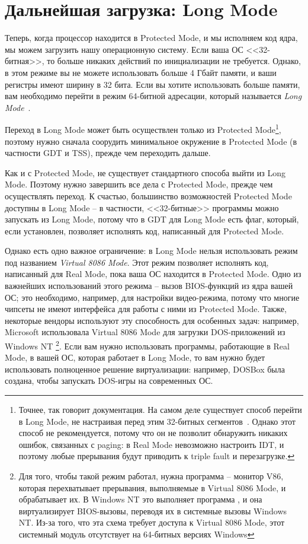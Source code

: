 \documentclass[a4page]{article}
\begin{document}
\section{Дальнейшая загрузка: Long Mode}

Теперь, когда процессор находится в Protected Mode,
и мы исполняем код ядра,
мы можем загрузить нашу операционную систему.
Если ваша ОС <<32-битная>>, то больше никаких действий по инициализации не требуется.
Однако, в этом режиме вы не можете использовать больше 4 Гбайт памяти,
и ваши регистры имеют ширину в 32 бита.
Если вы хотите использовать больше памяти,
вам необходимо перейти в режим 64-битной адресации, который называется \emph{Long Mode}~\cite{enwiki:longmode}.

Переход в Long Mode может быть осуществлен только из Protected Mode\footnote{
Точнее, так говорит документация.
На самом деле существует способ перейти в Long Mode,
не настраивая перед этим 32-битных сегментов~\cite{osforum:directlongmode}.
Однако этот способ не рекомендуется,
потому что он не позволит обнаружить никаких ошибок, связанных с paging:
в Real Mode невозможно настроить IDT, и поэтому любые прерывания будут приводить к triple fault и перезагрузке.},
поэтому нужно сначала соорудить минимальное окружение в Protected Mode
(в частности GDT и TSS), прежде чем переходить дальше.

Как и с Protected Mode, не существует стандартного способа выйти из Long Mode.
Поэтому нужно завершить все дела с Protected Mode, прежде чем осуществлять переход.
К счастью, большинство возможностей Protected Mode доступны в Long Mode -- 
в частности, <<32-битные>> программы можно запускать из Long Mode,
потому что в GDT для Long Mode есть флаг, который, если установлен,
позволяет исполнять код, написанный для Protected Mode.

Однако есть одно важное ограничение: в Long Mode нельзя использовать
режим под названием \emph{Virtual 8086 Mode}.
Этот режим позволяет исполнять код, написанный для Real Mode,
пока ваша ОС находится в Protected Mode.
Одно из важнейших использований этого режима -- вызов BIOS-функций из ядра вашей ОС;
это необходимо, например, для настройки видео-режима,
потому что многие чипсеты не имеют интерфейса для работы с ними из Protected Mode.
Также, некоторые вендоры используют эту способность для особенных задач:
например, Microsoft использовала Virtual 8086 Mode для загрузки DOS-приложений
из Windows NT
\footnote{Для того, чтобы такой режим работал, нужна программа -- монитор V86,
которая перехватывает прерывания, выполняемые в Virtual 8086 Mode,
и обрабатывает их.
В Windows NT это выполняет программа ,
и она виртуализирует BIOS-вызовы, переводя их в системные вызовы Windows NT.
Из-за того, что эта схема требует доступа к Virtual 8086 Mode,
этот системный модуль отсутствует на 64-битных версиях Windows}.
Если вам нужно использовать программы, работающие в Real Mode,
в вашей ОС, которая работает в Long Mode, то вам нужно будет использовать
полноценное решение виртуализации: например, DOSBox была создана, чтобы
запускать DOS-игры на современных ОС.
\end{document}
